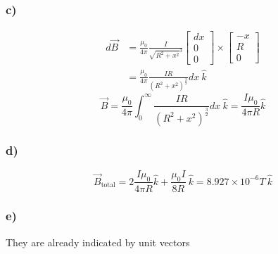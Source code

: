 \documentclass[../homework.tex]{subfiles}
\begin{document}
\subsubsection*{c)}
\begin{align*}
    d\vec{B} &= \frac{\mu_0}{4\pi}\frac{I}{\sqrt{R^2 + x^2}^3}
    \begin{bmatrix}
        dx \\
        0  \\
        0
    \end{bmatrix} \times
    \begin{bmatrix}
        -x \\
        R  \\
        0
    \end{bmatrix} \\
    &= \frac{\mu_0}{4\pi}\frac{IR}{(R^2 + x^2)^\frac{3}{2}} dx~\hat{k}
\end{align*}
\begin{equation*}
    \vec{B} = \frac{\mu_0}{4\pi}\int_{0}^{\infty} \frac{IR}{(R^2 + x^2)^\frac{3}{2}} dx~\hat{k} = \frac{I\mu_0}{4\pi R}\hat{k}
\end{equation*}

\subsubsection*{d)}
\begin{equation*}
    \vec{B}_{\text{total}} = 2\frac{I\mu_0}{4\pi R}\hat{k} + \frac{\mu_0I}{8 R}~\hat{k} = 8.927 \times 10^{-6} T~\hat{k}
\end{equation*}

\subsubsection*{e)}\indent\indent
They are already indicated by unit vectors
\end{document}
